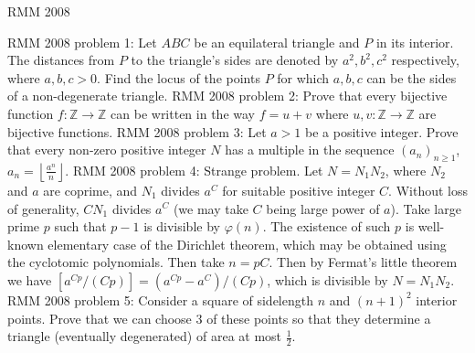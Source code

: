 RMM 2008 

RMM 2008 problem 1:  Let $ ABC$ be an equilateral triangle and $ P$ in its interior. The distances from $ P$ to the triangle's sides are denoted by $ a^2, b^2,c^2$ respectively, where $ a,b,c>0$. Find the locus of the points $ P$ for which $ a,b,c$ can be the sides of a non-degenerate triangle. 
RMM 2008 problem 2:  Prove that every bijective function $ f: \mathbb{Z}\rightarrow\mathbb{Z}$ can be written in the way $ f=u+v$ where $ u,v: \mathbb{Z}\rightarrow\mathbb{Z}$ are bijective functions. 
RMM 2008 problem 3:  Let $ a>1$ be a positive integer. Prove that every non-zero positive integer $ N$ has a multiple in the sequence $ (a_n)_{n\ge1}$, $ a_n=\left\lfloor\frac{a^n}n\right\rfloor$. 
RMM 2008 problem 4:  Strange problem. Let $ N=N_1N_2$, where $ N_2$ and $ a$ are coprime, and $ N_1$ divides $ a^C$ for suitable positive integer $ C$. Without loss of generality, $ CN_1$ divides $ a^C$ (we may take $ C$ being large power of $ a$). Take large prime $ p$ such that $ p-1$ is divisible by $ \varphi(n)$. The existence of such $ p$ is well-known elementary case of the Dirichlet theorem, which may be obtained using the cyclotomic polynomials. Then take $ n=pC$. Then by Fermat's little theorem we have $ [a^{Cp}/(Cp)]=(a^{Cp}-a^C)/(Cp)$, which is divisible by $ N=N_1N_2$. 
RMM 2008 problem 5:  Consider a square of sidelength $ n$ and $ (n+1)^2$ interior points. Prove that we can choose $ 3$ of these points so that they determine a triangle (eventually degenerated) of area at most $ \frac12$. 
